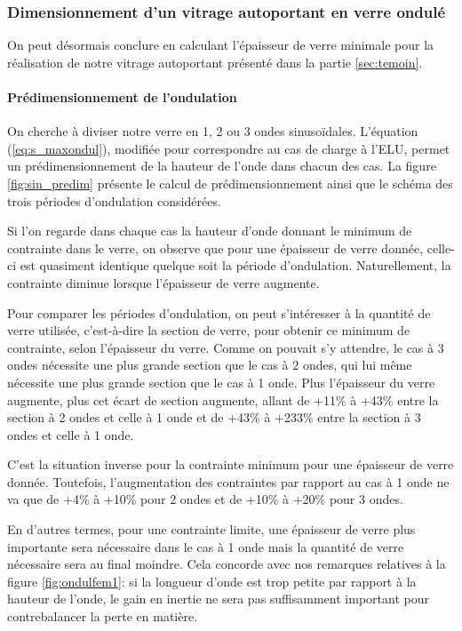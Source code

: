 \documentclass[11pt,titlepage]{article}
\begin{document}
\subsubsection{Dimensionnement d'un vitrage autoportant en verre ondulé}
On peut désormais conclure en calculant l'épaisseur de verre minimale pour la réalisation de notre vitrage autoportant présenté dans la partie \ref{sec:temoin}.

\paragraph{Prédimensionnement de l'ondulation}\mbox{}

On cherche à diviser notre verre en 1, 2 ou 3 ondes sinusoïdales. L'équation (\ref{eq:s_maxondul}), modifiée pour correspondre au cas de charge à l'\acrshort{ELU}, permet un prédimensionnement de la hauteur de l'onde dans chacun des cas. La figure \ref{fig:sin_predim} présente le calcul de prédimensionnement ainsi que le schéma des trois périodes d'ondulation considérées. 

Si l'on regarde dans chaque cas la hauteur d'onde donnant le minimum de contrainte dans le verre, on observe que pour une épaisseur de verre donnée, celle-ci est quasiment identique quelque soit la période d'ondulation. Naturellement, la contrainte diminue lorsque l'épaisseur de verre augmente.

Pour comparer les périodes d'ondulation, on peut s'intéresser à la quantité de verre utilisée, c'est-à-dire la section de verre, pour obtenir ce minimum de contrainte, selon l'épaisseur du verre. Comme on pouvait s'y attendre, le cas à 3 ondes nécessite une plus grande section que le cas à 2 ondes, qui lui même nécessite une plus grande section que le cas à 1 onde. Plus l'épaisseur du verre augmente, plus cet écart de section augmente, allant de +11\% à +43\% entre la section à 2 ondes et celle à 1 onde et de +43\% à +233\% entre la section à 3 ondes et celle à 1 onde.

C'est la situation inverse pour la contrainte minimum pour une épaisseur de verre donnée. Toutefois, l'augmentation des contraintes par rapport au cas à 1 onde ne va que de +4\% à +10\% pour 2 ondes et de +10\% à +20\% pour 3 ondes.

En d'autres termes, pour une contrainte limite, une épaisseur de verre plus importante sera nécessaire dans le cas à 1 onde mais la quantité de verre nécessaire sera au final moindre. Cela concorde avec nos remarques relatives à la figure \ref{fig:ondulfem1}: si la longueur d'onde est trop petite par rapport à la hauteur de l'onde, le gain en inertie ne sera pas suffisamment important pour contrebalancer la perte en matière.
\end{document}
